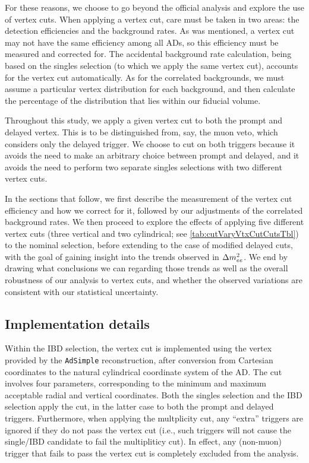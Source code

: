 \documentclass[../thesis.tex]{subfiles}
\begin{document}
For these reasons, we choose to go beyond the official analysis and explore the use of vertex cuts. When applying a vertex cut, care must be taken in two areas: the detection efficiencies and the background rates. As was mentioned, a vertex cut may not have the same efficiency among all ADs, so this efficiency must be measured and corrected for. The accidental background rate calculation, being based on the singles selection (to which we apply the same vertex cut), accounts for the vertex cut automatically. As for the correlated backgrounds, we must assume a particular vertex distribution for each background, and then calculate the percentage of the distribution that lies within our fiducial volume.

Throughout this study, we apply a given vertex cut to both the prompt and delayed vertex. This is to be distinguished from, say, the muon veto, which considers only the delayed trigger. We choose to cut on both triggers because it avoids the need to make an arbitrary choice between prompt and delayed, and it avoids the need to perform two separate singles selections with two different vertex cuts.

In the sections that follow, we first describe the measurement of the vertex cut efficiency and how we correct for it, followed by our adjustments of the correlated background rates. We then proceed to explore the effects of applying five different vertex cuts (three vertical and two cylindrical; see \autoref{tab:cutVaryVtxCutCutsTbl}) to the nominal selection, before extending to the case of modified delayed cuts, with the goal of gaining insight into the trends observed in $\Delta m^2_{ee}$. We end by drawing what conclusions we can regarding those trends as well as the overall robustness of our analysis to vertex cuts, and whether the observed variations are consistent with our statistical uncertainty.

\subsection{Implementation details}
\label{sec:cutVaryVtxCutImplDet}

Within the IBD selection, the vertex cut is implemented using the vertex provided by the \texttt{AdSimple} reconstruction, after conversion from Cartesian coordinates to the natural cylindrical coordinate system of the AD. The cut involves four parameters, corresponding to the minimum and maximum acceptable radial and vertical coordinates. Both the singles selection and the IBD selection apply the cut, in the latter case to both the prompt and delayed triggers. Furthermore, when applying the multplicity cut, any ``extra'' triggers are ignored if they do not pass the vertex cut (i.e., such triggers will not cause the single/IBD candidate to fail the multipliticy cut). In effect, any (non-muon) trigger that fails to pass the vertex cut is completely excluded from the analysis.
\end{document}

